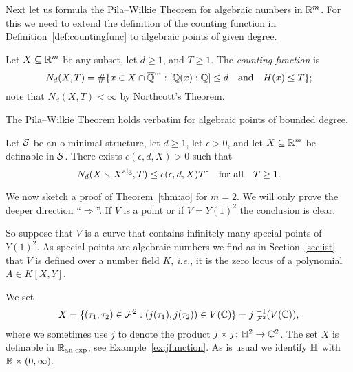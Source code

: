 Next let us formula the Pila--Wilkie Theorem for algebraic numbers in
${\mathbb{R}}^m$. For this we need to extend the definition of the counting
function in Definition~\ref{def:countingfunc} to algebraic points of
given degree.

\begin{definition}
  \label{def:countingfunc2}
  Let $X\subseteq{\mathbb{R}}^m$ be any subset, let $d\ge 1$, and $T\ge 1$.
  The \emph{counting
    function} is 
  \begin{equation*}
    N_d (X,T) = \#\{ x\in X\cap {\overline{\mathbb{Q}}}^m : [{\mathbb{Q}}(x):{\mathbb{Q}}]\le d
    \quad\text{and}\quad
    H(x)\le T\};
  \end{equation*}
  note that $N_d(X,T)<\infty$ by Northcott's Theorem. 
\end{definition}

The Pila--Wilkie Theorem holds verbatim for algebraic points of
bounded degree. 

\begin{theorem}
  \label{thm:pilaalg}
  Let ${\mathcal S}$ be an o-minimal structure, let $d\ge 1$, let $\epsilon
  >0$, and   let $X\subseteq{\mathbb{R}}^m$ be
  definable in ${\mathcal S}$. 
  There exists  $c(\epsilon,d,X)>0$ such that
  \begin{equation*}
    N_d(X\smallsetminus X^{\mathrm{alg}},T)\le c(\epsilon,d,X) T^\epsilon \quad\text{for
      all}\quad T\ge 1.
  \end{equation*}
\end{theorem}

We now  sketch a proof  of Theorem~\ref{thm:ao} for $m=2$.
We will only prove the deeper direction ``$\Longrightarrow$''.
If $V$ is a point or if $V=Y(1)^2$ the conclusion is clear.

So suppose that $V$ is a curve that  contains infinitely many special points
of $Y(1)^2$. As special points are algebraic numbers we find as in Section~\ref{sec:ist} that
$V$ is defined over a number field $K$, \textit{i.e.}, it is the
zero locus of a polynomial $A \in K[X,Y]$.

We set
\begin{equation}
  \label{def:Xao}
  X = \{(\tau_1,\tau_2) \in {\mathcal F}^2 : (j(\tau_1),j(\tau_2)) \in V({\mathbb{C}}) \} =
  j|_{{\mathcal F}^2}^{-1}(V({\mathbb{C}})),
\end{equation}
where we sometimes use $j$ to denote the product $j\times j\colon
{\mathbb{H}}^2\rightarrow{\mathbb{C}}^2$. The set $X$ is definable in ${{\mathbb{R}}_{\mathrm{an,exp}}}$, see
Example~\ref{ex:jfunction}.
As is usual we identify ${\mathbb{H}}$ with ${\mathbb{R}} \times (0,\infty)$. 

